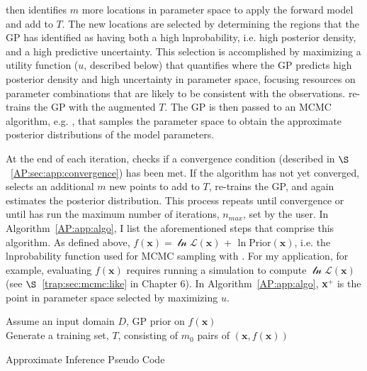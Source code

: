 \approxposterior then identifies $m$ more locations in parameter space to apply the forward model and add to $T$. The new locations are selected by determining the regions that the GP has identified as having both a high lnprobability, i.e. high posterior density, and a high predictive uncertainty. This selection is accomplished by maximizing a utility function ($u$, described below) that quantifies where the GP predicts high posterior density and high uncertainty in parameter space, focusing resources on parameter combinations that are likely to be consistent with the observations. \approxposterior re-trains the GP with the augmented $T$. The GP is then passed to an MCMC algorithm, e.g. \emcee, that samples the parameter space to obtain the approximate posterior distributions of the model parameters.

At the end of each iteration, \approxposterior checks if a convergence condition (described in $\S$~\ref{AP:sec:app:convergence}) has been met. If the algorithm  has not yet converged, \approxposterior selects an additional $m$ new points to add to $T$, re-trains the GP, and again estimates the posterior distribution. This process repeats until convergence or until \approxposterior has run the maximum number of iterations, $n_{max}$, set by the user. In Algorithm~\ref{AP:app:algo}, I list the aforementioned steps that comprise this algorithm. As defined above, $f(\textbf{x}) = \mathcal{\ln L}(\textbf{x})$ + $\ln \mathrm{Prior}(\textbf{x})$, i.e. the lnprobability function used for MCMC sampling with \emcee. For my application, for example, evaluating $f(\textbf{x})$ requires running a \vplanet simulation to compute $\mathcal{\ln L}(\textbf{x})$ (see $\S$~\ref{trap:sec:mcmc:like} in Chapter 6).
 In Algorithm~\ref{AP:app:algo}, \textbf{x}$^+$ is the point in parameter space selected by maximizing $u$. 
\begin{algorithm}
\SetAlgoLined
 Assume an input domain $D$, GP prior on $f(\textbf{x})$ \\
 Generate a training set, $T$, consisting of $m_0$ pairs of $(\textbf{x}, f(\textbf{x}))$ \\
\caption{\approxposterior Approximate Inference Pseudo Code  \label{AP:app:algo}}
\end{algorithm}
 
